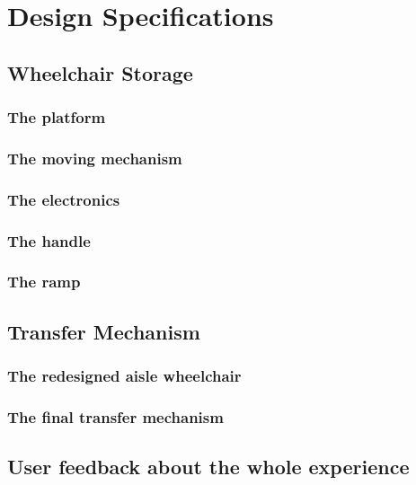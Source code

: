\chapter{Design Specifications}

\section{Wheelchair Storage}

\subsection{The platform}

\subsection{The moving mechanism}

\subsection{The electronics}

\subsection{The handle}

\subsection{The ramp}

\section{Transfer Mechanism}

\subsection{The redesigned aisle wheelchair}

\subsection{The final transfer mechanism}

\section{User feedback about the whole experience}
